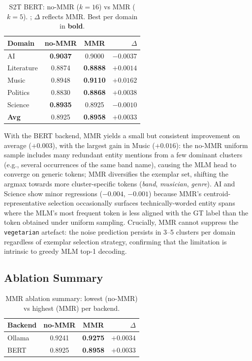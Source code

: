 \documentclass[11pt,a4paper]{article}
\begin{document}
\begin{table}[h]
\centering
\caption{S2T BERT: no-MMR ($k{=}16$) vs MMR ($k{=}5$).
; $\Delta$ reflects MMR.
Best per domain in \textbf{bold}.}
\label{tab:ablation_bert}
\setlength{\tabcolsep}{6pt}
\small
\begin{tabular}{l cc r}
\toprule
\textbf{Domain}
  & \cellcolor{bertcol}\textbf{no-MMR}
  & \cellcolor{s2tmmrcol}\textbf{MMR}
  & \textbf{$\Delta$} \\
\midrule
AI         & \textbf{0.9037} & 0.9000          & $-0.0037$ \\
Literature & 0.8874          & \textbf{0.8888} & $+0.0014$ \\
Music      & 0.8948          & \textbf{0.9110} & $+0.0162$ \\
Politics   & 0.8830          & \textbf{0.8868} & $+0.0038$ \\
Science    & \textbf{0.8935} & 0.8925          & $-0.0010$ \\
\midrule
\textbf{Avg} & 0.8925        & \textbf{0.8958} & $+0.0033$ \\
\bottomrule
\end{tabular}
\end{table}

\noindent
With the BERT backend, MMR yields a small but consistent improvement on average ($+0.003$),
with the largest gain in Music ($+0.016$): the no-MMR uniform sample
includes many redundant entity mentions from a few dominant clusters
(e.g., several occurrences of the same band name), causing the MLM
head to converge on generic tokens; MMR diversifies the exemplar set,
shifting the argmax towards more cluster-specific tokens
(\textit{band}, \textit{musician}, \textit{genre}).
AI and Science show minor regressions ($-0.004$, $-0.001$) because
MMR's centroid-representative selection occasionally surfaces
technically-worded entity spans where the MLM's most frequent token
is less aligned with the GT label than the token obtained under
uniform sampling.
Crucially, MMR cannot suppress the \texttt{vegetarian} artefact:
the noise prediction persists in 3--5 clusters per domain regardless
of exemplar selection strategy, confirming that the limitation is
intrinsic to greedy MLM top-1 decoding.

\subsection{Ablation Summary}

\begin{table}[h]
\centering
\caption{MMR ablation summary: lowest (no-MMR) vs highest (MMR) per backend.}
\label{tab:ablation_summary}
\setlength{\tabcolsep}{8pt}
\small
\begin{tabular}{l cc r}
\toprule
\textbf{Backend} & \textbf{no-MMR} & \textbf{MMR} & \textbf{$\Delta$} \\
\midrule
Ollama & 0.9241 & \textbf{0.9275} & $+0.0034$ \\
BERT   & 0.8925 & \textbf{0.8958} & $+0.0033$ \\
\bottomrule
\end{tabular}
\end{table}
\end{document}
